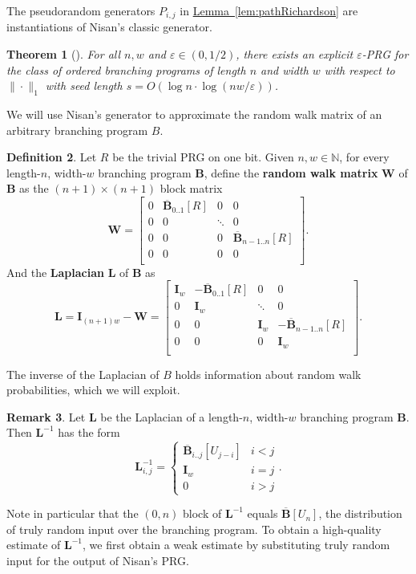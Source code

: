 \documentclass[11pt]{article}
\numberwithin{equation}{section}
\newtheorem{theorem}{Theorem}[section]
\theoremstyle{definition}
\newtheorem{definition}[theorem]{Definition}
\newtheorem{remark}[theorem]{Remark}
\theoremstyle{plain}
\newcommand{\N}{\mathbb N}
\newcommand{\expref}[2]{\hyperref[#2]{#1~\ref{#2}}}
\newcommand{\eps}{\varepsilon}
\newcommand{\mW}{\mathbf{W}}
\newcommand{\mL}{\mathbf{L}}
\newcommand{\I}{\mathbf{I}}
\newcommand{\bp}{{\mathbf{B}}}
\newcommand{\bbp}{\overline{\mathbf{B}}}
\begin{document}
The pseudorandom generators $P_{i,j}$ in \expref{Lemma}{lem:pathRichardson} are instantiations
of Nisan's classic generator. %
\begin{theorem}[\cite{Nisan92}]\label{thm:nisan}
    For all $n,w$ and $\eps \in (0,1/2)$, there exists an explicit $\eps$-PRG for the class of ordered branching programs of length $n$ and width $w$ with respect to $\|\cdot\|_{1}$ with seed length $s=O(\log n\cdot \log(nw/\eps))$.
\end{theorem}
We will use Nisan's generator to approximate the random walk matrix of an arbitrary branching program $B$.
\begin{definition}\label{def:pathLap}
Let $R$ be the trivial PRG on one bit. Given $n,w\in \N$, for every length-$n$, width-$w$ branching program $\bp$, define the \textbf{random walk matrix} $\mW$ of $\bp$ as the $(n+1)\times (n+1)$ block matrix
\[\mW=\begin{bmatrix}
0 & \bbp_{0..1}[R] & 0 & 0\\
0 & 0 & \ddots & 0\\
0 & 0 & 0 & \bbp_{n-1..n}[R]\\
0 & 0 & 0 & 0\\
\end{bmatrix}.\]
And the \textbf{Laplacian} $\mL$ of $\bp$ as
\[\mL=\I_{(n+1)w}-\mW=\begin{bmatrix}
\I_w & -\bbp_{0..1}[R] & 0 & 0\\
0 & \I_w & \ddots & 0\\
0 & 0 & \I_w & -\bbp_{n-1..n}[R]\\
0 & 0 & 0 & \I_w\\
\end{bmatrix}.\]
\end{definition}
The inverse of the Laplacian of $B$ holds information about random walk probabilities, which we will exploit.
\begin{remark}\label{rmk:pathLinv}
Let $\mL$ be the Laplacian of a length-$n$, width-$w$ branching program $\bp$. Then $\mL^{-1}$ has the form %
\[\mL^{-1}_{i,j}=\begin{cases}
\bbp_{i..j}[U_{j-i}] & i<j\\
\I_w & i=j\\
0 & i>j
\end{cases}.\] 
\end{remark}
Note in particular that the $(0,n)$ block of $\mL^{-1}$ equals $\bbp[U_n]$, the distribution of truly random input over the branching program. To obtain a high-quality %
estimate of $\mL^{-1}$, we first obtain a weak estimate by substituting truly random input for the output of Nisan's PRG.
\end{document}
